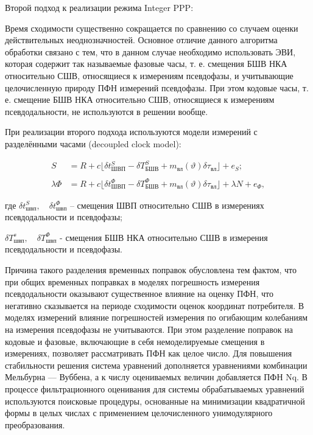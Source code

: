 \documentclass[14pt,a4paper,oneside]{extarticle}
\begin{document}
Второй подход к реализации режима Integer PPP:

Время сходимости существенно сокращается по сравнению со случаем оценки действительных неоднозначностей. Основное отличие данного алгоритма обработки связано с тем, что в данном случае необходимо использовать ЭВИ, которая содержит так называемые фазовые часы, т. е. смещения БШВ НКА относительно СШВ, относящиеся к измерениям псевдофазы, и учитывающие целочисленную природу ПФН измерений псевдофазы. При этом кодовые часы, т. е. смещение БШВ НКА относительно СШВ, относящиеся к измерениям псевдодальности, не используются в решении вообще.

При реализации второго подхода используются модели измерений с разделёнными часами (decoupled clock model):

\[\begin{aligned}S&=R+c\lfloor\delta t_{\text{ШВП}} ^ { S }-\delta T_{\text{БШВ}} ^ { S }+m_{\text{вл}}(\vartheta)\delta\tau_{\text{вл}} \rfloor + e _ { S };\\\\\lambda\Phi&=R+c\lfloor\delta t_{\text{ШВП}} ^ { \Phi }-\delta T_{\text{БШВ}} ^ { \Phi }+m_{\text{вл}}(\vartheta)\delta\tau_{\text{вл}}\rfloor+\lambda N+e_{\Phi},\end{aligned}\]

где $\delta t_\text{швп}^S,\quad\delta t_\text{швп}^\Phi $ – смещения ШВП относительно СШВ в измерениях псевдодальности и псевдофазы;

$\delta T_\text{швп}^s,\quad\delta T_\text{швп}^\Phi $ - смещения БШВ НКА относительно СШВ в измерения псевдодальности и псевдофазы.

Причина такого разделения временных поправок обусловлена тем фактом, что при общих временных поправках в моделях погрешность измерения псевдодальности оказывают существенное влияние на оценку ПФН, что негативно сказывается на периоде сходимости оценок координат потребителя. В моделях измерений влияние погрешностей измерения по огибающим колебаниям на измерения псевдофазы не учитываются. При этом разделение поправок на кодовые и фазовые, включающие в себя немоделируемые смещения в измерениях, позволяет рассматривать ПФН как целое число. Для повышения стабильности решения система уравнений дополняется уравнениями комбинации Мельбурна –– Вуббена, а к числу оцениваемых величин добавляется
ПФН Nq. В процессе фильтрационного оценивания для системы обрабатываемых уравнений используются поисковые процедуры, основанные на минимизации квадратичной формы в целых числах с применением целочисленного унимодулярного преобразования.
\end{document}
